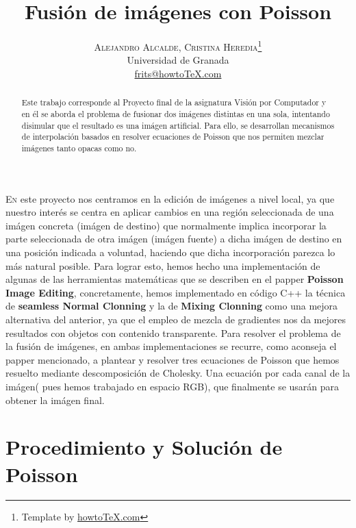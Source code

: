 \documentclass[oneside]{article}
\title{\vspace{-15mm}%
	\fontsize{24pt}{10pt}\selectfont
	\textbf{Fusión de imágenes con Poisson}
	}
\author{%
	\large
	\textsc{Alejandro Alcalde, Cristina Heredia}\thanks{Template by \href{http://www.howtotex.com}{howtoTeX.com}} \\[2mm]
	\normalsize	Universidad de Granada \\
	\normalsize	\href{mailto:frits@howtoTeX.com}{frits@howtoTeX.com}
	\vspace{-5mm}
	}
\date{}
\begin{document}
\maketitle
\thispagestyle{fancy}

\begin{abstract}
\noindent Este trabajo corresponde al Proyecto final de la asignatura Visión por Computador y en él se aborda el problema de fusionar dos imágenes
distintas en una sola, intentando disimular que el resultado es una imágen artificial. Para ello, se desarrollan mecanismos de interpolación
basados en resolver ecuaciones de Poisson que nos permiten mezclar imágenes tanto opacas como no.
\end{abstract}


\begin{multicols}{1}
\lettrine[nindent=0em,lines=3]{E}n este proyecto nos centramos en la edición de imágenes a nivel local, ya que nuestro interés se centra en aplicar
cambios en una región seleccionada de una imágen concreta (imágen de destino) que normalmente implica incorporar la parte seleccionada de otra imágen
(imágen fuente)  a dicha imágen de destino en una posición indicada a voluntad, haciendo que dicha incorporación parezca lo más natural posible. \newline \newline Para lograr esto, hemos hecho una implementación
de algunas de las herramientas matemáticas que se describen en el papper \textbf{Poisson Image Editing}, concretamente, hemos implementado en código C++ la técnica de  \textbf{seamless Normal Clonning} y la de \textbf{Mixing Clonning} como una mejora alternativa
del anterior, ya que el empleo de mezcla de gradientes nos da mejores resultados con objetos con contenido transparente. \newline Para resolver el problema de la fusión de imágenes, en ambas implementaciones
se recurre, como aconseja el papper mencionado, a plantear y resolver tres ecuaciones de Poisson que hemos resuelto mediante descomposición de Cholesky. Una ecuación por cada canal de la imágen( pues hemos trabajado en espacio RGB), que finalmente se usarán
para obtener la imágen final. \newline

\section{Procedimiento y Solución de Poisson}


\end{multicols}
\end{document}
